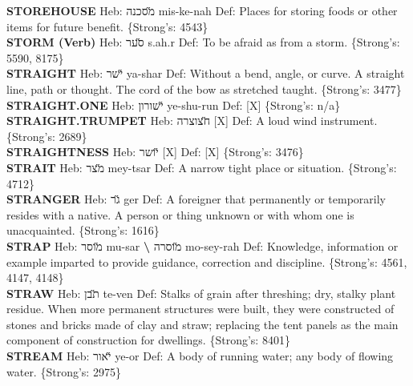 {\textbf{STOREHOUSE} Heb: {\large\H מסכנה} mis-ke-nah Def: Places for storing foods or other items for future benefit. \{Strong's: 4543\}\hfill{}\\

\textbf{STORM (Verb)} Heb: {\large\H סער} s.ah.r Def: To be afraid as from a storm. \{Strong's: 5590, 8175\}\hfill{}\\

\textbf{STRAIGHT} Heb: {\large\H ישר} ya-shar Def: Without a bend, angle, or curve. A straight line, path or thought. The cord of the bow as stretched taught. \{Strong's: 3477\}\hfill{}\\

\textbf{STRAIGHT.ONE} Heb: {\large\H ישורון} ye-shu-run Def: {[}X{]} \{Strong's: n/a\}\hfill{}\\

\textbf{STRAIGHT.TRUMPET} Heb: {\large\H חצוצרה} {[}X{]} Def: A loud wind instrument. \{Strong's: 2689\}\hfill{}\\

\textbf{STRAIGHTNESS} Heb: {\large\H יושר} {[}X{]} Def: {[}X{]} \{Strong's: 3476\}\hfill{}\\

\textbf{STRAIT} Heb: {\large\H מצר} mey-tsar Def: A narrow tight place or situation. \{Strong's: 4712\}\hfill{}\\

\textbf{STRANGER} Heb: {\large\H גר} ger Def: A foreigner that permanently or temporarily resides with a native. A person or thing unknown or with whom one is unacquainted. \{Strong's: 1616\}\hfill{}\\

\textbf{STRAP} Heb: {\large\H מוסר} mu-sar \textbf{\textbackslash{}} {\large\H מוסרה} mo-sey-rah Def: Knowledge, information or example imparted to provide guidance, correction and discipline. \{Strong's: 4561, 4147, 4148\}\hfill{}\\

\textbf{STRAW} Heb: {\large\H תבן} te-ven Def: Stalks of grain after threshing; dry, stalky plant residue. When more permanent structures were built, they were constructed of stones and bricks made of clay and straw; replacing the tent panels as the main component of construction for dwellings. \{Strong's: 8401\}\hfill{}\\

\textbf{STREAM} Heb: {\large\H יאור} ye-or Def: A body of running water; any body of flowing water. \{Strong's: 2975\}\hfill{}\\

}
